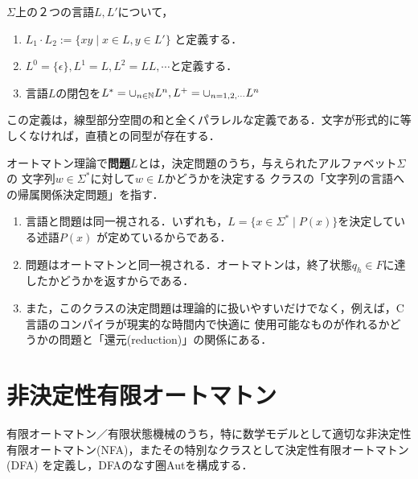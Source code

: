 \documentclass[uplatex, 12pt, dvipdfmx]{jsreport}
\begin{document}
\begin{definition}
    $\Sigma$上の２つの言語$L,L'$について，
    \begin{enumerate}
        \item $L_1\cdot L_2:=\{xy\mid x\in L,y\in L'\}$
        と定義する．
        \item $L^0=\{\epsilon\}, L^1=L,L^2=LL,\cdots$と定義する．
        \item 言語$L$の閉包を$L^*=\cup_{n\in\mathbb{N}}L^n, L^+=\cup_{n=1,2,\cdots}L^n$
    \end{enumerate}
\end{definition}
\begin{remark}
    この定義は，線型部分空間の和と全くパラレルな定義である．文字が形式的に等しくなければ，直積との同型が存在する．
\end{remark}

\begin{definition}[problem]
    オートマトン理論で\textbf{問題}$L$とは，決定問題のうち，与えられたアルファベット$\Sigma$の
    文字列$w\in\Sigma^*$に対して$w\in L$かどうかを決定する
    クラスの「文字列の言語への帰属関係決定問題」を指す．
\end{definition}
\begin{remark}\mbox{}
    \begin{enumerate}
        \item 言語と問題は同一視される．いずれも，$L=\{x\in\Sigma^*\mid P(x)\}$を決定している述語$P(x)$
        が定めているからである．
        \item 問題はオートマトンと同一視される．オートマトンは，終了状態$q_h\in F$に達したかどうかを返すからである．
        \item また，このクラスの決定問題は理論的に扱いやすいだけでなく，例えば，C言語のコンパイラが現実的な時間内で快適に
        使用可能なものが作れるかどうかの問題と「還元(reduction)」の関係にある．
    \end{enumerate}
\end{remark}

\section{非決定性有限オートマトン}

\begin{screen}
    有限オートマトン／有限状態機械のうち，特に数学モデルとして適切な非決定性有限オートマトン(NFA)，またその特別なクラスとして決定性有限オートマトン(DFA)
    を定義し，DFAのなす圏Autを構成する．
\end{screen}
\end{document}
